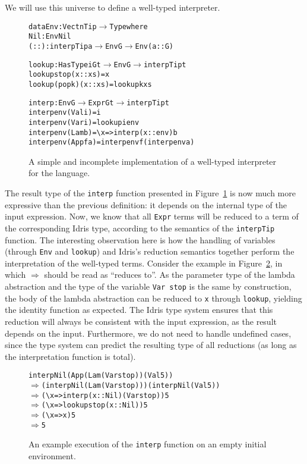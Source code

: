 We will use this universe to define a well-typed interpreter.

\begin{figure}
\begin{alltt}
data Env : Vect n Tip \(\rightarrow\) Type where
  Nil  : Env Nil
  (::) : interpTip a \(\rightarrow\) Env G \(\rightarrow\) Env (a :: G)

lookup : HasType i G t \(\rightarrow\) Env G \(\rightarrow\) interpTip t
lookup stop    (x :: xs) = x
lookup (pop k) (x :: xs) = lookup k xs

interp : Env G \(\rightarrow\) Expr G t \(\rightarrow\) interpTip t
interp env (Val i)   = i
interp env (Var i)   = lookup i env
interp env (Lam b)   = \textbackslash{x} => interp (x :: env) b
interp env (App f a) = interp env f (interp env a)
\end{alltt}
\caption{A simple and incomplete implementation of a well-typed interpreter for the language.}
\label{fig:well-typed-interpreter}
\end{figure}

The result type of the \texttt{interp} function presented in Figure~\ref{fig:well-typed-interpreter} is now much more expressive than the previous definition: it depends on the internal type of the input expression. Now, we know that all \texttt{Expr} terms will be reduced to a term of the corresponding Idris type, according to the semantics of the \texttt{interpTip} function. The interesting observation here is how the handling of variables (through \texttt{Env} and \texttt{lookup}) and Idris's reduction semantics together perform the interpretation of the well-typed terms. Consider the example in Figure~\ref{fig:well-typed-interpreter-example}, in which $\Rightarrow$ should be read as ``reduces to''. As the parameter type of the lambda abstraction and the type of the variable \texttt{Var stop} is the same by construction, the body of the lambda abstraction can be reduced to \texttt{x} through \texttt{lookup}, yielding the identity function as expected. The Idris type system ensures that this reduction will always be consistent with the input expression, as the result depends on the input. Furthermore, we do not need to handle undefined cases, since the type system can predict the resulting type of all reductions (as long as the interpretation function is total).

\begin{figure}
\begin{alltt}
interp Nil (App (Lam (Var stop)) (Val 5))
\(\Rightarrow\) (interp Nil (Lam (Var stop))) (interp Nil (Val 5))
\(\Rightarrow\) (\textbackslash{x} => interp (x :: Nil) (Var stop)) 5
\(\Rightarrow\) (\textbackslash{x} => lookup stop (x :: Nil)) 5
\(\Rightarrow\) (\textbackslash{x} => x) 5
\(\Rightarrow\) 5
\end{alltt}
\caption{An example execution of the \texttt{interp} function on an empty initial environment.}
\label{fig:well-typed-interpreter-example}
\end{figure}

